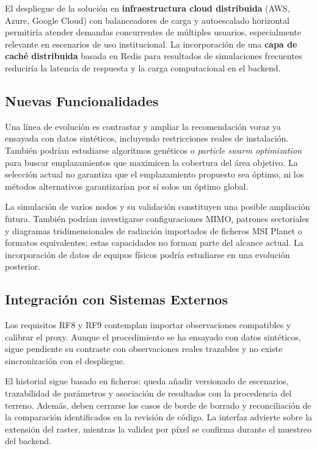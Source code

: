 El despliegue de la solución en \textbf{infraestructura cloud distribuida} (AWS, Azure, Google Cloud) con balanceadores de carga y autoescalado horizontal permitiría atender demandas concurrentes de múltiples usuarios, especialmente relevante en escenarios de uso institucional. La incorporación de una \textbf{capa de caché distribuida} basada en Redis para resultados de simulaciones frecuentes reduciría la latencia de respuesta y la carga computacional en el backend.

\subsection*{Nuevas Funcionalidades}

Una línea de evolución es contrastar y ampliar la recomendación voraz ya ensayada con
datos sintéticos, incluyendo restricciones reales de instalación. También podrían
estudiarse algoritmos genéticos o \textit{particle swarm optimization} para buscar
emplazamientos que maximicen la cobertura del área objetivo. La selección actual no
garantiza que el emplazamiento propuesto sea óptimo, ni los métodos alternativos
garantizarían por sí solos un óptimo global.

La simulación de varios nodos y su validación constituyen una posible ampliación futura.
También podrían investigarse configuraciones MIMO, patrones sectoriales y diagramas
tridimensionales de radiación importados de ficheros MSI Planet o formatos equivalentes;
estas capacidades no forman parte del alcance actual.
La incorporación de datos de equipos físicos podría estudiarse en una evolución posterior.

\subsection*{Integración con Sistemas Externos}

Los requisitos RF8 y RF9 contemplan importar observaciones compatibles y calibrar el
proxy. Aunque el procedimiento se ha ensayado con datos sintéticos, sigue pendiente
su contraste con observaciones reales trazables y no existe sincronización con el despliegue.

El historial sigue basado en ficheros: queda añadir versionado de escenarios, trazabilidad
de parámetros y asociación de resultados con la procedencia del terreno. Además, deben
cerrarse los casos de borde de borrado y reconciliación de la comparación identificados en
la revisión de código. La interfaz advierte sobre la extensión del raster, mientras la
validez por píxel se confirma durante el muestreo del backend.

